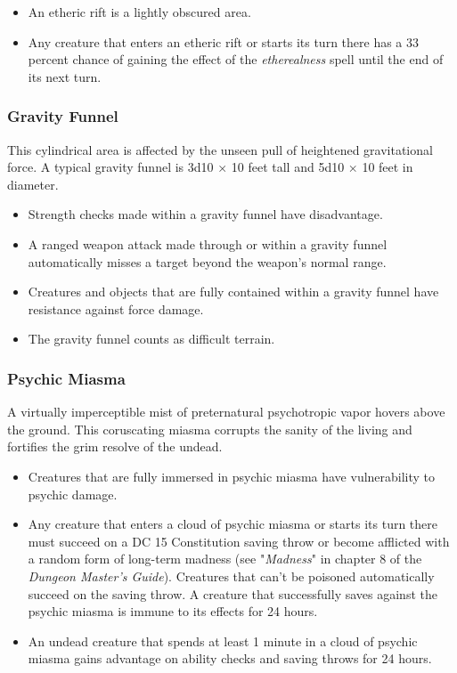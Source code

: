 \documentclass[10pt,a4paper,twoside,bg=print,twocolumn,openany,nodeprecatedcode]{dndbook}
\begin{document}
\begin{itemize}
\item An etheric rift is a lightly obscured area.
\item Any creature that enters an etheric rift or starts its turn there has a 33 percent chance of gaining the effect of the \textit{etherealness} spell until the end of its next turn.
\end{itemize}

\subsubsection{Gravity Funnel}
This cylindrical area is affected by the unseen pull of heightened gravitational force. A typical gravity funnel is 3d10 × 10 feet tall and 5d10 × 10 feet in diameter.


\begin{itemize}
\item Strength checks made within a gravity funnel have disadvantage.
\item A ranged weapon attack made through or within a gravity funnel automatically misses a target beyond the weapon's normal range.
\item Creatures and objects that are fully contained within a gravity funnel have resistance against force damage.
\item The gravity funnel counts as difficult terrain.
\end{itemize}

\subsubsection{Psychic Miasma}
A virtually imperceptible mist of preternatural psychotropic vapor hovers above the ground. This coruscating miasma corrupts the sanity of the living and fortifies the grim resolve of the undead.


\begin{itemize}
\item Creatures that are fully immersed in psychic miasma have vulnerability to psychic damage.
\item Any creature that enters a cloud of psychic miasma or starts its turn there must succeed on a DC 15 Constitution saving throw or become afflicted with a random form of long-term madness (see "\textit{Madness}" in chapter 8 of the \textit{Dungeon Master's Guide}). Creatures that can't be poisoned automatically succeed on the saving throw. A creature that successfully saves against the psychic miasma is immune to its effects for 24 hours.
\item An undead creature that spends at least 1 minute in a cloud of psychic miasma gains advantage on ability checks and saving throws for 24 hours.
\end{itemize}
\end{document}
